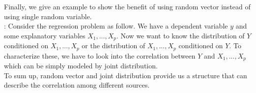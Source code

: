 \documentclass[../MultivariateProbabilityAndRelatedProperties.tex]{subfiles}
\begin{document}
Finally, we give an example to show the benefit of using random vector instead of using single random variable.\\

: Consider the regression problem as follow. We have a dependent variable $y$ and some explanatory variables $X_1,...,X_p$. Now we want to know the distribution of $Y$ conditioned on $X_1,...,X_p$ or the distribution of $X_1,...,X_p$ conditioned on $Y$. To characterize these, we have to look into the correlation between $Y$ and $X_1,...,X_p$ which can be simply modeled by joint distribution.\\

To sum up, random vector and joint distribution provide us a structure that can describe the correlation among different sources. 
\end{document}

